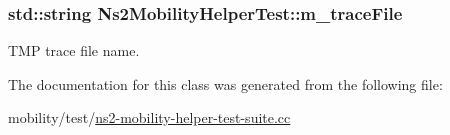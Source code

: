 \subsubsection[{\texorpdfstring{m\+\_\+trace\+File}{m_traceFile}}]{\setlength{\rightskip}{0pt plus 5cm}std\+::string Ns2\+Mobility\+Helper\+Test\+::m\+\_\+trace\+File\hspace{0.3cm}{\ttfamily [private]}}\hypertarget{classNs2MobilityHelperTest_a1bc1788ddcd0eb7ecf3e7d254afcd453}{}\label{classNs2MobilityHelperTest_a1bc1788ddcd0eb7ecf3e7d254afcd453}


T\+MP trace file name. 



The documentation for this class was generated from the following file\+:\begin{DoxyCompactItemize}
\item 
mobility/test/\hyperlink{ns2-mobility-helper-test-suite_8cc}{ns2-\/mobility-\/helper-\/test-\/suite.\+cc}\end{DoxyCompactItemize}
